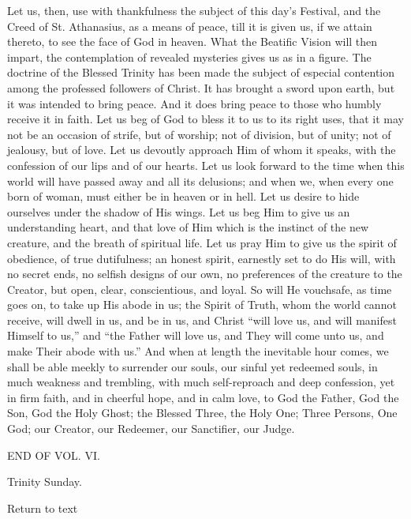 Let us, then, use with thankfulness the subject of this day's
Festival, and the Creed of St. Athanasius, as a means of peace, till
it is given us, if we attain thereto, to see the face of God in
heaven. What the Beatific Vision will then impart, the contemplation
of revealed mysteries gives us as in a figure. The doctrine of the
Blessed Trinity has been made the subject of especial contention among
the professed followers of Christ. It has brought a sword upon earth,
but it was intended to bring peace. And it does bring peace to those
who humbly receive it in faith. Let us beg of God to bless it to us to
its right uses, that it may not be an occasion of strife, but of
worship; not of division, but of unity; not of jealousy, but of love.
Let us devoutly approach Him of whom it speaks, with the confession of
our lips and of our hearts. Let us look forward to the time when this
world will have passed away and all its delusions; and when we, when
every one born of woman, must either be in heaven or in hell. Let us
desire to hide ourselves under the shadow of His wings. Let us beg Him
to give us an understanding heart, and that love of Him which is the
instinct of the new creature, and the breath of spiritual life. Let us
pray Him to give us the spirit of obedience, of true dutifulness; an
honest spirit, earnestly set to do His will, with no secret ends, no
selfish designs of our own, no preferences of the creature to the
Creator, but open, clear, conscientious, and loyal. So will He
vouchsafe, as time goes on, to take up His abode in us; the Spirit of
Truth, whom the world cannot receive, will dwell in us, and be in us,
and Christ ``will love us, and will manifest Himself to us,''
and ``the Father will love us, and They will come unto us, and
make Their abode with us.'' And when at length the inevitable hour
comes, we shall be able meekly to surrender our souls, our sinful yet
redeemed souls, in much weakness and trembling, with much
self-reproach and deep confession, yet in firm faith, and in cheerful
hope, and in calm love, to God the Father, God the Son, God the Holy
Ghost; the Blessed Three, the Holy One; Three Persons, One God; our
Creator, our Redeemer, our Sanctifier, our Judge.

END OF VOL. VI.


Trinity Sunday.

Return to text
